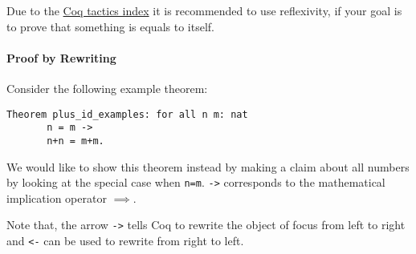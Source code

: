    Due to the \href{https://pjreddie.com/coq-tactics/}{Coq tactics index} it is recommended to use reflexivity, if your goal is to prove that something is equals to itself.  
      
     \paragraph{Proof by Rewriting}
     
     Consider the following example theorem:     
	 \begin{lstlisting}[caption=Example]
	 Theorem plus_id_examples: for all n m: nat
       n = m -> 
	   n+n = m+m.	 
	 \end{lstlisting}  
	
	 We would like to show this theorem instead by making a claim about all numbers by looking at the special case when \lstinline!n=m!.
     \lstinline!->! corresponds to the mathematical implication operator $\implies$. 
     
    
    
     Note that, the arrow \lstinline!->! tells Coq to rewrite the object of focus from left to right and \lstinline!<-! can be used to rewrite from right to left.
     
